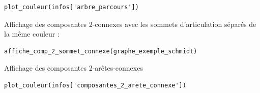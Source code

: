\documentclass{article}      %
\begin{document}
\begin{lstlisting}[style=code-style]
plot_couleur(infos['arbre_parcours'])
\end{lstlisting}
\begin{figure}[H]
    \centering
\end{figure}

Affichage des composantes 2-connexes avec les sommets d'articulation séparés de la même couleur :
\begin{lstlisting}[style=code-style]
affiche_comp_2_sommet_connexe(graphe_exemple_schmidt)
\end{lstlisting}
\begin{figure}[H]
    \centering
\end{figure}

Affichage des composantes 2-arêtes-connexes
\begin{lstlisting}[style=code-style]
plot_couleur(infos['composantes_2_arete_connexe'])
\end{lstlisting}
\begin{figure}[H]
    \centering
\end{figure}
\end{document}
